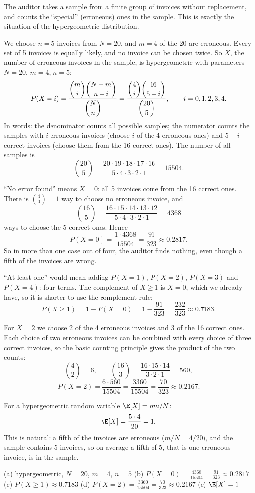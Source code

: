 \begin{solution}
	\idea The auditor takes a sample from a finite group of invoices without
	replacement, and counts the ``special'' (erroneous) ones in the sample. This
	is exactly the situation of the hypergeometric distribution.

	 We choose $n=5$ invoices from $N=20$, and $m=4$ of the 20 are
	erroneous. Every set of 5 invoices is equally likely, and no invoice can be
	chosen twice. So $X$, the number of erroneous invoices in the sample, is
	hypergeometric with parameters $N=20$, $m=4$, $n=5$:
	\[ P(X=i)=\frac{\dbinom{m}{i}\dbinom{N-m}{n-i}}{\dbinom{N}{n}}
		=\frac{\dbinom{4}{i}\dbinom{16}{5-i}}{\dbinom{20}{5}},
		\qquad i=0,1,2,3,4. \]
	In words: the denominator counts all possible samples; the numerator counts
	the samples with $i$ erroneous invoices (choose $i$ of the 4 erroneous ones)
	and $5-i$ correct invoices (choose them from the 16 correct ones). The
	number of all samples is
	\[ \binom{20}{5}=\frac{20\cdot19\cdot18\cdot17\cdot16}{5\cdot4\cdot3\cdot2\cdot1}=15504. \]

	 ``No error found'' means $X=0$: all 5 invoices come from the 16
	correct ones. There is $\binom40=1$ way to choose no erroneous invoice, and
	\[ \binom{16}{5}=\frac{16\cdot15\cdot14\cdot13\cdot12}{5\cdot4\cdot3\cdot2\cdot1}=4368 \]
	ways to choose the 5 correct ones. Hence
	\[ P(X=0)=\frac{1\cdot4368}{15504}=\frac{91}{323}\approx0.2817. \]
	So in more than one case out of four, the auditor finds nothing, even though
	a fifth of the invoices are wrong.

	 ``At least one'' would mean adding $P(X=1)$, $P(X=2)$, $P(X=3)$
	and $P(X=4)$: four terms. The complement of $X\ge1$ is $X=0$, which we
	already have, so it is shorter to use the complement rule:
	\[ P(X\ge1)=1-P(X=0)=1-\frac{91}{323}=\frac{232}{323}\approx0.7183. \]

	 For $X=2$ we choose 2 of the 4 erroneous invoices and 3 of the
	16 correct ones. Each choice of two erroneous invoices can be combined
	with every choice of three correct invoices, so the basic counting
	principle gives the product of the two counts:
	\[ \binom42=6,\qquad \binom{16}{3}=\frac{16\cdot15\cdot14}{3\cdot2\cdot1}=560, \]
	\[ P(X=2)=\frac{6\cdot560}{15504}=\frac{3360}{15504}=\frac{70}{323}\approx0.2167. \]

	 For a hypergeometric random variable $\E[X]=nm/N$:
	\[ \E[X]=\frac{5\cdot4}{20}=1. \]
	This is natural: a fifth of the invoices are erroneous ($m/N=4/20$), and
	the sample contains 5 invoices, so on average a fifth of 5, that is one
	erroneous invoice, is in the sample.
	\begin{answer}
		(a) hypergeometric, $N=20$, $m=4$, $n=5$ \quad
		(b) $P(X=0)=\frac{4368}{15504}=\frac{91}{323}\approx0.2817$ \quad
		(c) $P(X\ge1)\approx0.7183$ \quad
		(d) $P(X=2)=\frac{3360}{15504}=\frac{70}{323}\approx0.2167$ \quad
		(e) $\E[X]=1$
	\end{answer}
\end{solution}
